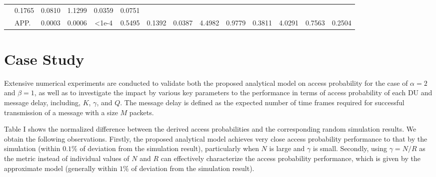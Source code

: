 \documentclass[a4paper]{IEEEtran}
\begin{document}
\begin{table}[ht!]
\begin{tabular}{|ll|ccc|ccc|ccc|ccc|}
& \multicolumn{1}{c|}{\cellcolor[HTML]{FFFFFF}0.1765} 
& 0.0810                         
& \multicolumn{1}{c|}{\cellcolor[HTML]{FFFFFF}1.1299} 
& \multicolumn{1}{l|}{\cellcolor[HTML]{FFFFFF}0.0359} 
& 0.0751                         
\\ \cline{2-14} 
\rowcolor[HTML]{FFFFFF} 
\multicolumn{1}{|l|}{\multirow{-3}{*}{\cellcolor[HTML]{C0C0C0}(3,2)}} 
& \cellcolor[HTML]{C0C0C0}APP.                        
& \multicolumn{1}{c|}{\cellcolor[HTML]{FFFFFF}0.0003}          
& \multicolumn{1}{l|}{\cellcolor[HTML]{FFFFFF}0.0006}          
& \cellcolor[HTML]{FFFFFF}\textless{}1e-4 
& \multicolumn{1}{c|}{\cellcolor[HTML]{FFFFFF}0.5495} 
& \multicolumn{1}{l|}{\cellcolor[HTML]{FFFFFF}0.1392}  
& 0.0387                         
& \multicolumn{1}{c|}{\cellcolor[HTML]{FFFFFF}4.4982} 
& \multicolumn{1}{c|}{\cellcolor[HTML]{FFFFFF}0.9779} 
& 0.3811                         
& \multicolumn{1}{c|}{\cellcolor[HTML]{FFFFFF}4.0291} 
& \multicolumn{1}{l|}{\cellcolor[HTML]{FFFFFF}0.7563} 
& 0.2504                         
\\ \hline
\end{tabular}
\end{table}

\section{Case Study}

Extensive numerical experiments are conducted to validate both the proposed analytical model on access probability for the case of $\alpha=2$ and $\beta=1$, as well as to investigate the impact by various key parameters to the performance in terms of access probability of each DU and message delay, including, $K$, $\gamma$, and $Q$. The message delay is defined as the expected number of time frames required for successful transmission of a message with a size $M$ packets. 

Table I shows the normalized difference between the derived access probabilities and the corresponding random simulation results. We obtain the following observations. Firstly, the proposed analytical model achieves very close access probability performance to that by the simulation (within $0.1\%$ of deviation from the simulation result), particularly when $N$ is large and $\gamma$ is small. Secondly, using $\gamma=N/R$ as the metric instead of individual values of $N$ and $R$ can effectively characterize the access probability performance, which is given by the approximate model (generally within $1\%$ of deviation from the simulation result).
\end{document}
